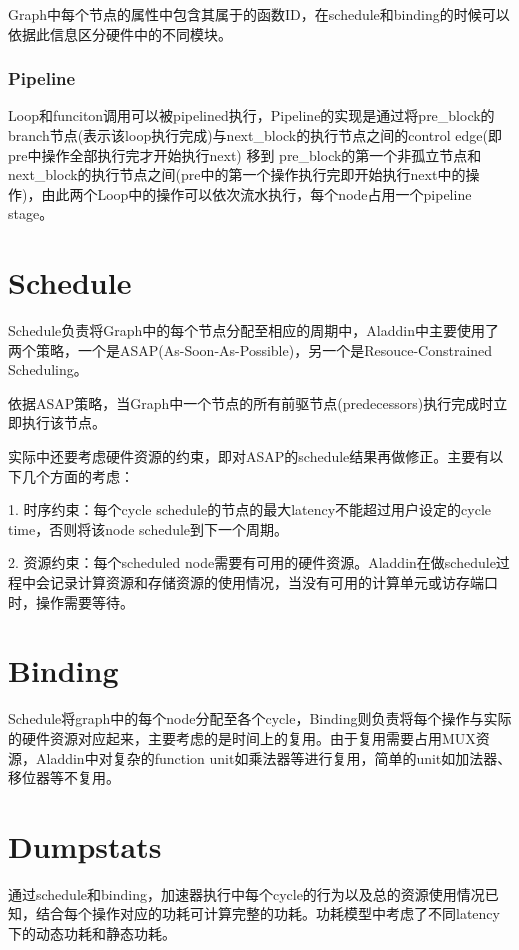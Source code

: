 \documentclass[UTF8]{scrartcl}
\begin{document}
			Graph中每个节点的属性中包含其属于的函数ID，在schedule和binding的时候可以依据此信息区分硬件中的不同模块。
					
		\subsubsection{Pipeline}
		
			Loop和funciton调用可以被pipelined执行，Pipeline的实现是通过将pre\_block的branch节点(表示该loop执行完成)与next\_block的执行节点之间的control edge(即pre中操作全部执行完才开始执行next) 移到 pre\_block的第一个非孤立节点和next\_block的执行节点之间(pre中的第一个操作执行完即开始执行next中的操作)，由此两个Loop中的操作可以依次流水执行，每个node占用一个pipeline stage。
			
	
	
\section{Schedule}

	Schedule负责将Graph中的每个节点分配至相应的周期中，Aladdin中主要使用了两个策略，一个是ASAP(As-Soon-As-Possible)，另一个是Resouce-Constrained Scheduling。
		
	依据ASAP策略，当Graph中一个节点的所有前驱节点(predecessors)执行完成时立即执行该节点。
		
	实际中还要考虑硬件资源的约束，即对ASAP的schedule结果再做修正。主要有以下几个方面的考虑：
		
	1.  时序约束：每个cycle schedule的节点的最大latency不能超过用户设定的cycle time，否则将该node schedule到下一个周期。
	
	2.  资源约束：每个scheduled node需要有可用的硬件资源。Aladdin在做schedule过程中会记录计算资源和存储资源的使用情况，当没有可用的计算单元或访存端口时，操作需要等待。

\section{Binding}
	
	Schedule将graph中的每个node分配至各个cycle，Binding则负责将每个操作与实际的硬件资源对应起来，主要考虑的是时间上的复用。由于复用需要占用MUX资源，Aladdin中对复杂的function unit如乘法器等进行复用，简单的unit如加法器、移位器等不复用。

\section{Dumpstats}
	
	通过schedule和binding，加速器执行中每个cycle的行为以及总的资源使用情况已知，结合每个操作对应的功耗可计算完整的功耗。功耗模型中考虑了不同latency下的动态功耗和静态功耗。
			
\end{document}
